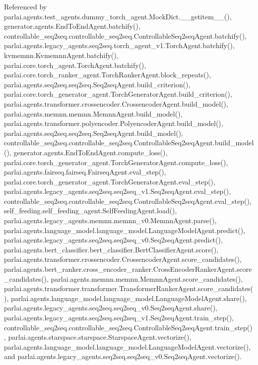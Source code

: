 Referenced by parlai.\+agents.\+test\+\_\+agents.\+dummy\+\_\+torch\+\_\+agent.\+Mock\+Dict.\+\_\+\+\_\+getitem\+\_\+\+\_\+(), generator.\+agents.\+End\+To\+End\+Agent.\+batchify(), controllable\+\_\+seq2seq.\+controllable\+\_\+seq2seq.\+Controllable\+Seq2seq\+Agent.\+batchify(), parlai.\+agents.\+legacy\+\_\+agents.\+seq2seq.\+torch\+\_\+agent\+\_\+v1.\+Torch\+Agent.\+batchify(), kvmemnn.\+Kvmemnn\+Agent.\+batchify(), parlai.\+core.\+torch\+\_\+agent.\+Torch\+Agent.\+batchify(), parlai.\+core.\+torch\+\_\+ranker\+\_\+agent.\+Torch\+Ranker\+Agent.\+block\+\_\+repeats(), parlai.\+agents.\+seq2seq.\+seq2seq.\+Seq2seq\+Agent.\+build\+\_\+criterion(), parlai.\+core.\+torch\+\_\+generator\+\_\+agent.\+Torch\+Generator\+Agent.\+build\+\_\+criterion(), parlai.\+agents.\+transformer.\+crossencoder.\+Crossencoder\+Agent.\+build\+\_\+model(), parlai.\+agents.\+memnn.\+memnn.\+Memnn\+Agent.\+build\+\_\+model(), parlai.\+agents.\+transformer.\+polyencoder.\+Polyencoder\+Agent.\+build\+\_\+model(), parlai.\+agents.\+seq2seq.\+seq2seq.\+Seq2seq\+Agent.\+build\+\_\+model(), controllable\+\_\+seq2seq.\+controllable\+\_\+seq2seq.\+Controllable\+Seq2seq\+Agent.\+build\+\_\+model(), generator.\+agents.\+End\+To\+End\+Agent.\+compute\+\_\+loss(), parlai.\+core.\+torch\+\_\+generator\+\_\+agent.\+Torch\+Generator\+Agent.\+compute\+\_\+loss(), parlai.\+agents.\+fairseq.\+fairseq.\+Fairseq\+Agent.\+eval\+\_\+step(), parlai.\+core.\+torch\+\_\+generator\+\_\+agent.\+Torch\+Generator\+Agent.\+eval\+\_\+step(), parlai.\+agents.\+legacy\+\_\+agents.\+seq2seq.\+seq2seq\+\_\+v1.\+Seq2seq\+Agent.\+eval\+\_\+step(), controllable\+\_\+seq2seq.\+controllable\+\_\+seq2seq.\+Controllable\+Seq2seq\+Agent.\+eval\+\_\+step(), self\+\_\+feeding.\+self\+\_\+feeding\+\_\+agent.\+Self\+Feeding\+Agent.\+load(), parlai.\+agents.\+legacy\+\_\+agents.\+memnn.\+memnn\+\_\+v0.\+Memnn\+Agent.\+parse(), parlai.\+agents.\+language\+\_\+model.\+language\+\_\+model.\+Language\+Model\+Agent.\+predict(), parlai.\+agents.\+legacy\+\_\+agents.\+seq2seq.\+seq2seq\+\_\+v0.\+Seq2seq\+Agent.\+predict(), parlai.\+agents.\+bert\+\_\+classifier.\+bert\+\_\+classifier.\+Bert\+Classifier\+Agent.\+score(), parlai.\+agents.\+transformer.\+crossencoder.\+Crossencoder\+Agent.\+score\+\_\+candidates(), parlai.\+agents.\+bert\+\_\+ranker.\+cross\+\_\+encoder\+\_\+ranker.\+Cross\+Encoder\+Ranker\+Agent.\+score\+\_\+candidates(), parlai.\+agents.\+memnn.\+memnn.\+Memnn\+Agent.\+score\+\_\+candidates(), parlai.\+agents.\+transformer.\+transformer.\+Transformer\+Ranker\+Agent.\+score\+\_\+candidates(), parlai.\+agents.\+language\+\_\+model.\+language\+\_\+model.\+Language\+Model\+Agent.\+share(), parlai.\+agents.\+legacy\+\_\+agents.\+seq2seq.\+seq2seq\+\_\+v0.\+Seq2seq\+Agent.\+share(), parlai.\+agents.\+legacy\+\_\+agents.\+seq2seq.\+seq2seq\+\_\+v1.\+Seq2seq\+Agent.\+train\+\_\+step(), controllable\+\_\+seq2seq.\+controllable\+\_\+seq2seq.\+Controllable\+Seq2seq\+Agent.\+train\+\_\+step(), parlai.\+agents.\+starspace.\+starspace.\+Starspace\+Agent.\+vectorize(), parlai.\+agents.\+language\+\_\+model.\+language\+\_\+model.\+Language\+Model\+Agent.\+vectorize(), and parlai.\+agents.\+legacy\+\_\+agents.\+seq2seq.\+seq2seq\+\_\+v0.\+Seq2seq\+Agent.\+vectorize().

